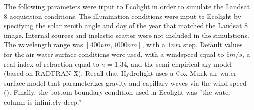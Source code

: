 \documentclass[onecolumn,3p,letterpaper]{elsarticle}
\begin{document}
The following parameters were input to Ecolight in order to simulate the Landsat 8 acquisition conditions. The illumination conditions were input to Ecolight by specifying the solar zenith angle and day of the year that matched the Landsat 8 image. Internal sources and inelastic scatter were not included in the simulations. The wavelength range was $[400nm,1000nm]$, with a $1nm$ step. Default values for the air-water surface conditions were used, with a windspeed equal to $5m/s$, a real index of refraction equal to $n=1.34$, and the semi-empirical sky model (based on RADTRAN-X). Recall that Hydrolight uses a Cox-Munk air-water surface model that parameterizes gravity and capillary waves via the wind speed (\cite{MobleyHEtech}). Finally, the bottom boundary condition used in Ecolight was ``the water column is infinitely deep.''
\end{document}
